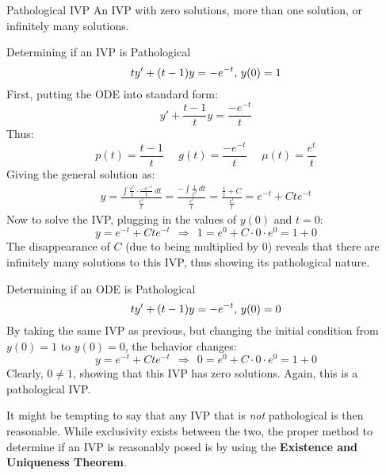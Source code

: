 \documentclass[12pt]{article}
\begin{document}
\begin{definition}{Pathological IVP}
  An IVP with zero solutions, more than one solution, or infinitely many solutions.
\end{definition}

\begin{example}{Determining if an IVP is Pathological}
  \begin{equation*}
    ty'+(t-1)y = -e^{-t}\textup{,}\ y(0) = 1
  \end{equation*}
  First, putting the ODE into standard form:
  \begin{equation*}
    y'+ \frac{t-1}{t}y = \frac{-e^{-t}}{t}
  \end{equation*}
  Thus:
  \begin{equation*}
    p(t) = \frac{t-1}{t}\ \ \ \ \ \ g(t) = \frac{-e^{-t}}{t}\ \ \ \ \ \ \mu(t) = \frac{e^t}{t}
  \end{equation*}
  Giving the general solution as:
  \begin{align*}
    y = \frac{\int \frac{e^t}{t} \cdot \frac{-e^{-t}}{t} \,dt}{\frac{e^t}{t}} = \frac{-\int \frac{1}{t^2} \,dt}{\frac{e^t}{t}} = \frac{\frac{1}{t} + C}{\frac{e^t}{t}} = e^{-t} + Cte^{-t}
  \end{align*}
  Now to solve the IVP, plugging in the values of $y(0)$ and $t=0$:
  \begin{equation*}
    y = e^{-t} + Cte^{-t}\ \  \Rightarrow\ \ 1 = e^{0} + C \cdot 0 \cdot e^{0} = 1 + 0
  \end{equation*}
  The disappearance of $C$ (due to being multiplied by $0$) reveals that there are infinitely many solutions to this IVP, thus showing its pathological nature.
\end{example}

\begin{example}{Determining if an ODE is Pathological}
  \begin{equation*}
    ty'+(t-1)y = -e^{-t}\textup{,}\ y(0) = 0
  \end{equation*}
  By taking the same IVP as previous, but changing the initial condition from $y(0) = 1$ to $y(0) = 0$, the behavior changes:
  \begin{equation*}
    y = e^{-t} + Cte^{-t}\ \  \Rightarrow\ \ 0 = e^{0} + C \cdot 0 \cdot e^{0} = 1 + 0
  \end{equation*}
  Clearly, $0 \neq 1$, showing that this IVP has zero solutions. Again, this is a pathological IVP.
\end{example}

It might be tempting to say that any IVP that is \textit{not} pathological is then reasonable. While exclusivity exists between the two, the proper method to determine if an IVP is reasonably posed is by using the \textbf{Existence and Uniqueness Theorem}.
\end{document}
